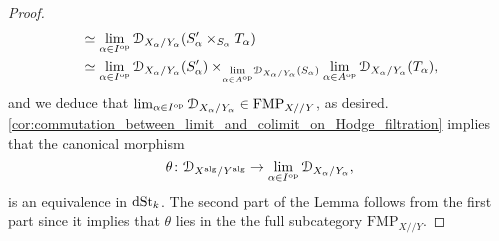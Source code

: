 \documentclass[10pt,a4paper,reqno]{amsart} %
\theoremstyle{plain}
\theoremstyle{definition}
\theoremstyle{remark}
\numberwithin{equation}{section}
\begin{document}
\begin{proof}
\begin{align*}
                                                                & \simeq \lim_{\alpha \in I^\mathrm{op}}\mathcal D_{X_\alpha/ Y_\alpha}(S'_\alpha \times_{S_\alpha} T_\alpha) \\
                                                                & \simeq \lim_{\alpha \in I^\mathrm{op}} \mathcal D_{X_\alpha/ Y_\alpha}(S'_\alpha) \times_{\underset{\alpha \in A^\mathrm{op}}{\lim} \mathcal D_{X_\alpha/ Y_\alpha}(S_\alpha)}  \lim_{\alpha \in A^\mathrm{op}} \mathcal D_{X_\alpha/ Y_\alpha}(T_\alpha),
        \end{align*}
    and we deduce that $\lim_{\alpha \in I^\mathrm{op}} \mathcal D_{X_\alpha/ Y_\alpha} \in \mathrm{FMP}_{X/ /Y}$, as desired. \cref{cor:commutation_between_limit_and_colimit_on_Hodge_filtration} implies that
    the canonical morphism
        \[\theta \colon \mathcal D_{X^\mathrm{alg}/ Y^\mathrm{alg}} \to \lim_{\alpha \in I^\mathrm{op}} \mathcal D_{X_\alpha/ Y_\alpha},\]
    is an equivalence in $\mathrm{dSt}_k$. The second part of the Lemma follows from the first part since it implies that $\theta$ lies in the the full subcategory \infcat $\mathrm{FMP}_{X/ /Y}$.
\end{proof}
\end{document}
